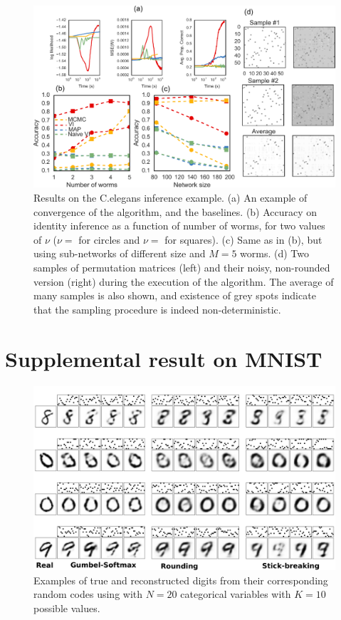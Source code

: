 \documentclass[twoside]{article}
\begin{document}
\begin{figure}[h!]
  \centering
  \includegraphics[width=5.in]{../figures/figure7.pdf} 
  \caption{Results on the C.elegans inference example. (a) An example of convergence of the algorithm, and the baselines. (b) Accuracy on identity inference as a function of number of worms, for two values of $\nu$ ($\nu=$ for circles and $\nu=$ for squares). (c) Same as in (b), but using sub-networks of different size and $M=5$ worms. (d) Two samples of permutation matrices (left) and their noisy, non-rounded version (right) during the execution of the algorithm. The average of many samples is also shown, and existence of grey spots indicate that the sampling procedure is indeed non-deterministic.}
\label{fig:elegantresults}
\end{figure}



\clearpage



\appendix
\section{Supplemental result on MNIST}
\begin{figure}[t]
  \centering
  \includegraphics[width=5.in]{../figures/figure4.pdf} 
  \caption{Examples of true and reconstructed digits from their corresponding random codes using with $N=20$ categorical variables with $K=10$ possible values.
  }
\label{fig:synthetic}
\end{figure}
\end{document}
